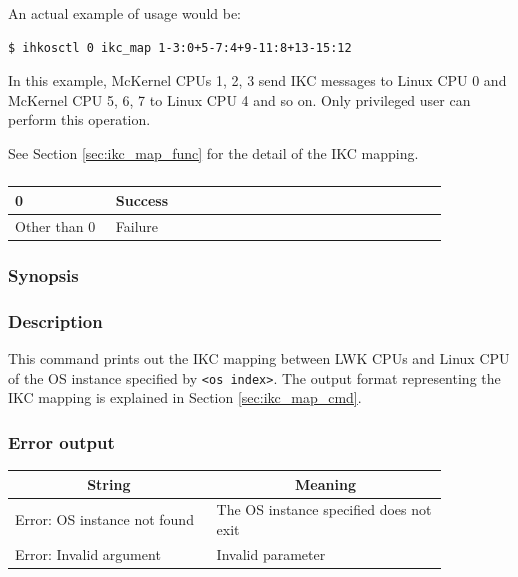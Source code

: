 \documentclass[twoside,11pt,fleqn]{book}
\begin{document}
An actual example of usage would be:

\begin{verbatim}
$ ihkosctl 0 ikc_map 1-3:0+5-7:4+9-11:8+13-15:12
\end{verbatim}

In this example, McKernel CPUs 1, 2, 3 send IKC messages to Linux CPU 0 and McKernel CPU 5, 6, 7 to Linux CPU 4 and so on.
Only privileged user can perform this operation.

See Section \ref{sec:ikc_map_func} for the detail of the IKC mapping.

\subsubsection*{}
\begin{table}[!h]
\footnotesize
\begin{tabular}{|p{0.20\linewidth}|p{0.66\linewidth}|} \hline
0&Success\\ \hline
Other than 0&Failure\\ \hline
\end{tabular}
\vspace{-0em}
\end{table}
\FloatBarrier

\subsubsection{}
\subsubsection*{Synopsis}{\quad} 
\subsubsection*{Description}{\quad}
This command prints out the IKC mapping between LWK CPUs and Linux CPU of the OS instance specified by \texttt{<os index>}. The output format representing the IKC mapping is explained in Section \ref{sec:ikc_map_cmd}.
\subsubsection*{Error output}{\quad}
\begin{table}[!h]
\footnotesize
\begin{tabular}{|p{0.40\linewidth}|p{0.46\linewidth}|} \hline
\multicolumn{1}{|c}{\textbf{String}}&\multicolumn{1}{|c|}{\textbf{Meaning}}\\ \hline \hline
Error: OS instance not found&The OS instance specified does not exit\\ \hline
Error: Invalid argument&Invalid parameter\\ \hline
\end{tabular}
\vspace{-0em}
\end{table}
\FloatBarrier
\end{document}
